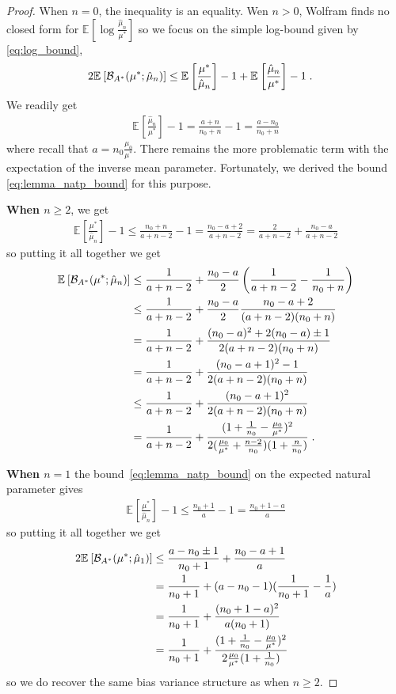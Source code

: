 \documentclass{article}
\newcommand*{\expect}[2][]{\ensuremath{\mathbb{E}_{#1} \left[ #2 \right] }} %
\newcommand{\logpart}{A}
\newcommand{\bregmanconj}{\cB_{\logpart^*}}
\newcommand{\MAPm}{\hat \mu_n}
\begin{document}
\begin{proof}
When $n=0$, the inequality is an equality. 
Wen $n>0$, Wolfram finds no closed form for $\expect{\log\frac{\MAPm}{\mu^*}}$ so we focus on the simple log-bound given by \eqref{eq:log_bound},
\begin{align}
	2\expect{\bregmanconj(\mu^*; \MAPm)} 
	&\leq \expect{\frac{\mu^*}{\MAPm}} -1  + \expect{\frac{\MAPm}{\mu^*}} - 1 \; .
\end{align}
We readily get 
\begin{align}
	 \expect{\frac{\MAPm}{\mu^*}} - 1 = \frac{a+n}{n_0+n} - 1 = \frac{a - n_0}{n_0+n}
\end{align}
where recall that $a=n_0\frac{\mu_0}{\mu^*}$. 
There remains the more problematic term with the expectation of the inverse mean parameter.
Fortunately, we derived the bound \eqref{eq:lemma_natp_bound} for this purpose.

\textbf{When $n\geq 2$}, we get 
\begin{align}
	\expect{\frac{\mu^*}{\MAPm}} - 1 
	\leq \frac{n_0 + n}{a +n - 2} -1
	= \frac{n_0 - a + 2}{a +n - 2}
	 = \frac{2}{a +n - 2} + \frac{n_0 - a}{a +n - 2}
\end{align}
so putting it all together we get 
\begin{align}
	\expect{\bregmanconj(\mu^*; \MAPm)} 
	&\leq \frac{1}{a+n-2} + \frac{n_0-a}{2}  \left( \inv{a+n-2} - \inv{n_0+n} \right)\\
	&\leq \frac{1}{a+n-2} + \frac{n_0-a}{2}  \frac{n_0 - a + 2}{(a+n-2)(n_0+n)} \\
	&= \frac{1}{a+n-2} + \frac{(n_0 - a)^2 + 2(n_0-a) \pm 1}{2(a+n-2)(n_0+n)} \\
	&= \frac{1}{a+n-2} + \frac{(n_0 - a +1)^2 - 1}{2(a+n-2)(n_0+n)} \\
	&\leq \frac{1}{a+n-2} + \frac{(n_0 - a +1)^2}{2(a+n-2)(n_0 + n)} \\
	&= \frac{1}{a+n-2} + \frac{(1 + \inv{n_0} - \frac{\mu_0}{\mu^*})^2}{2 (\frac{\mu_0}{\mu^*}+\frac{n-2}{n_0})(1 + \frac{n}{n_0} )} \; .
\end{align}

\textbf{When $n=1$} the bound~\eqref{eq:lemma_natp_bound}  on the expected natural parameter gives
\begin{align}
	\expect{\frac{\mu^*}{\MAPm}} - 1 
	\leq \frac{n_0 + 1}{a} -1
	= \frac{n_0 +1 - a}{a}
\end{align}
so putting it all together we get
\begin{align}
	2\expect{\bregmanconj(\mu^*; \hat \mu_1)} 
	&\leq \frac{a - n_0 \pm 1}{n_0 + 1}  + \frac{n_0 - a + 1}{a} \\
	& = \inv{n_0+1}  + ( a - n_0 - 1)(\inv{n_0+1} - \inv{a}) \\
	& = \inv{n_0+1}  + \frac{(n_0 + 1 -a)^2}{a(n_0+1)}\\
	&= \inv{n_0+1}  + \frac{(1 + \inv{n_0} - \frac{\mu_0}{\mu^*})^2}{2 \frac{\mu_0}{\mu^*}(1 + \inv{n_0} )} 
\end{align}
so we do recover the same bias variance structure as when $n\geq2$.
\end{proof}
\end{document}

